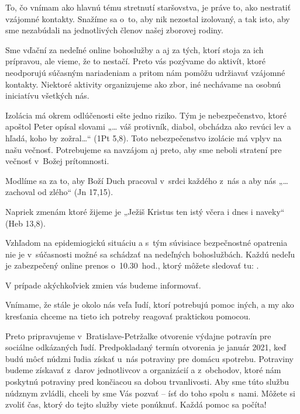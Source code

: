 To, čo vnímam ako hlavnú tému stretnutí staršovstva, je práve to, ako nestratiť vzájomné kontakty. Snažíme sa o~to, aby nik nezostal izolovaný, a tak isto, aby sme nezabúdali na jednotlivých členov našej zborovej rodiny.

Sme vďační za nedeľné online bohoslužby a aj za tých, ktorí stoja za ich prípravou, ale vieme, že to nestačí. Preto vás pozývame do aktivít, ktoré neodporujú súčasným nariadeniam a pritom nám pomôžu udržiavať vzájomné kontakty. Niektoré aktivity organizujeme ako zbor, iné nechávame na osobnú iniciatívu všetkých nás.

Izolácia má okrem odlúčenosti ešte jedno riziko. Tým je nebezpečenstvo, ktoré apoštol Peter opísal slovami „… váš protivník, diabol, obchádza ako revúci lev a hľadá, koho by zožral…“ (1Pt 5,8). Toto nebezpečenstvo izolácie má vplyv na našu večnosť. Potrebujeme sa navzájom aj preto, aby sme neboli stratení pre večnosť v~Božej prítomnosti.

Modlíme sa za to, aby Boží Duch pracoval v~srdci každého z~nás a aby nás „… zachoval od zlého“ (Jn 17,15).

Napriek zmenám ktoré žijeme je „Ježiš Kristus ten istý včera i dnes i naveky“ (Heb 13,8).



Vzhľadom na epidemiogickú situáciu a s~tým súvisiace bezpečnostné opatrenia nie je v~súčasnosti možné sa schádzať na nedeľných bohoslužbách. Každú nedeľu je zabezpečený online prenos o~10.30~hod., ktorý môžete sledovať tu: .

V prípade akýchkoľviek zmien vás budeme informovať.
\vfill\break


Vnímame, že stále je okolo nás veľa ľudí, ktorí potrebujú pomoc iných, a my ako kresťania chceme na tieto ich potreby reagovať praktickou pomocou.

Preto pripravujeme v~Bratislave-Petržalke otvorenie výdajne potravín pre sociálne odkázaných ľudí. Predpokladaný termín otvorenia je január 2021, keď budú môcť núdzni ľudia získať u~nás potraviny pre domácu spotrebu. Potraviny budeme získavať z~darov jednotlivcov a organizácií a z~obchodov, ktoré nám poskytnú potraviny pred končiacou sa dobou trvanlivosti. Aby sme túto službu núdznym zvládli, chceli by sme Vás pozvať – ísť do toho spolu s~nami. Môžete si zvoliť čas, ktorý do tejto služby viete ponúknuť. Každá pomoc sa počíta!

